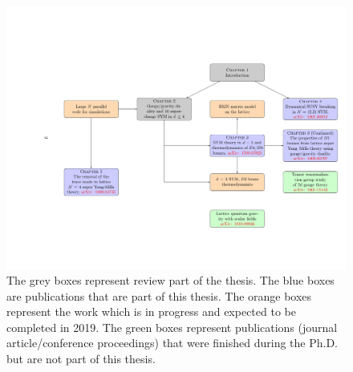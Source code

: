 \newpage 

\begin{figure}[tbp]
  \centering
  \includegraphics[width=\linewidth]{Figures/Flowchart.pdf}
  \caption{\label{fig:flow1}The grey boxes represent review part of the thesis. The blue boxes are publications that are part of this thesis. The orange boxes represent the work 
  which is in progress and expected to be completed in 2019. The green boxes represent publications (journal article/conference proceedings) that were finished during the Ph.D. but
  are not part of this thesis. }
\end{figure}



